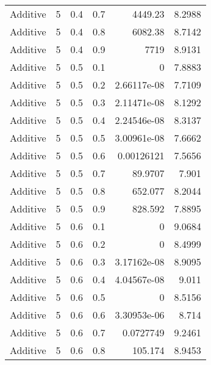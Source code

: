 \documentclass{article}
\begin{document}
\begin{longtable}[H]{lrrrrr}
 Additive       &       5 &   0.4 &            0.7 &   4449.23        &          8.2988 \\
 Additive       &       5 &   0.4 &            0.8 &   6082.38        &          8.7142 \\
 Additive       &       5 &   0.4 &            0.9 &   7719           &          8.9131 \\
 Additive       &       5 &   0.5 &            0.1 &      0           &          7.8883 \\
 Additive       &       5 &   0.5 &            0.2 &      2.66117e-08 &          7.7109 \\
 Additive       &       5 &   0.5 &            0.3 &      2.11471e-08 &          8.1292 \\
 Additive       &       5 &   0.5 &            0.4 &      2.24546e-08 &          8.3137 \\
 Additive       &       5 &   0.5 &            0.5 &      3.00961e-08 &          7.6662 \\
 Additive       &       5 &   0.5 &            0.6 &      0.00126121  &          7.5656 \\
 Additive       &       5 &   0.5 &            0.7 &     89.9707      &          7.901  \\
 Additive       &       5 &   0.5 &            0.8 &    652.077       &          8.2044 \\
 Additive       &       5 &   0.5 &            0.9 &    828.592       &          7.8895 \\
 Additive       &       5 &   0.6 &            0.1 &      0           &          9.0684 \\
 Additive       &       5 &   0.6 &            0.2 &      0           &          8.4999 \\
 Additive       &       5 &   0.6 &            0.3 &      3.17162e-08 &          8.9095 \\
 Additive       &       5 &   0.6 &            0.4 &      4.04567e-08 &          9.011  \\
 Additive       &       5 &   0.6 &            0.5 &      0           &          8.5156 \\
 Additive       &       5 &   0.6 &            0.6 &      3.30953e-06 &          8.714  \\
 Additive       &       5 &   0.6 &            0.7 &      0.0727749   &          9.2461 \\
 Additive       &       5 &   0.6 &            0.8 &    105.174       &          8.9453 \\

\end{longtable}
\end{document}
